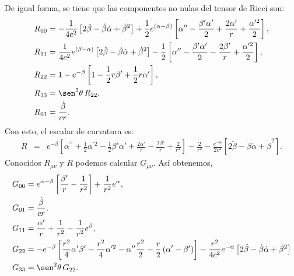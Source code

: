 De igual forma, se tiene que las componentes no nulas del tensor de Ricci son:
\begin{align}
R_{00} & =-\frac{1}{4c^2}\left[ 2\ddot{\beta}-\dot{\beta}\dot{\alpha}%
+\dot{\beta}^2\right] +\frac{1}2e^{(\alpha-\beta)}
\left[\alpha^{\prime\prime}-\frac{\beta'\alpha'}{2}+\frac{2\alpha'}%
{r}+\frac{\alpha^{\prime2}}2\right] \label{ricci00},\\
R_{11} & =\frac{1}{4c^2}e^{(\beta-\alpha)} \left[ 2\ddot{\beta}%
-\dot{\beta}\dot{\alpha}+\dot{\beta}^2\right] -\frac{1}2\left[
\alpha^{\prime\prime}-\frac{\beta'\alpha'}2-\frac{2\beta'%
}{r}+\frac{\alpha^{\prime2}}2\right] ,\label{ricci11}\\
R_{22} & =1-e^{-\beta} \left[ 1-\frac{1}2r\beta
'+\frac{1}2r\alpha'\right] ,\label{ricci22}\\
R_{33} & =\sen^2\theta\, R_{22} ,\label{ricci33}\\
R_{01} &= \frac{\dot{\beta}}{cr}.\label{ricci01}
\end{align}
Con esto, el escalar de curvatura es:
\begin{eqnarray}
R &=& e^{-\beta}\left[
\alpha^{\prime\prime}+\frac{1}{2}\alpha^{\prime2}-\frac{1}2\beta'\alpha'+\frac{
2\alpha'}{r}-\frac{2\beta'}{r} +\frac2{r^2}\right] -\frac2{r^2}
-\frac{e^{-\alpha}}{2c^2} \left[ 2\ddot{\beta}-\dot{\beta}%
\dot{\alpha}+\dot{\beta}^2\right].
\end{eqnarray}
Conocidos $R_{\mu\nu}$ y $R$ podemos calcular $G_{\mu\nu}$. Así obtenemos,
\begin{align}
G_{00} & =e^{\alpha-\beta}\left[ \frac{\beta'}{r}-\frac{1}{r^2}\right]
+\frac{1}{r^2}e^\alpha, \\
G_{01} &= \frac{\dot{\beta}}{cr},\label{g01b}\\
G_{11} &=\frac{\alpha'}{r}+\frac{1}{r^2}-\frac{1}{r^2}e^{\beta} ,\label{g11}\\
G_{22} & =-e^{-\beta} \left[ \frac{r^2}{4}\alpha^{\prime
}\beta'-\frac{r^2}{4}\alpha^{\prime2}-\alpha^{\prime\prime}\frac{r^2}{2}-\frac{r}{2}\left( \alpha^{\prime}-\beta'\right) \right] -\frac{r^2}{4c^2}e^{-\alpha}\left[2\ddot{\beta}-\dot{\beta}\dot{\alpha}
+\dot{\beta}^2\right] \\
G_{33} & =\sen^2\theta\, G_{22}.
\end{align}


